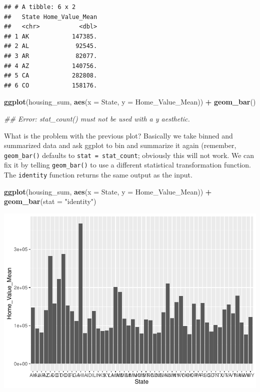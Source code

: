 \documentclass[]{book}
\newenvironment{Shaded}{\begin{snugshade}}{\end{snugshade}}
\newcommand{\CommentTok}[1]{\textcolor[rgb]{0.56,0.35,0.01}{\textit{#1}}}
\newcommand{\DataTypeTok}[1]{\textcolor[rgb]{0.13,0.29,0.53}{#1}}
\newcommand{\KeywordTok}[1]{\textcolor[rgb]{0.13,0.29,0.53}{\textbf{#1}}}
\newcommand{\NormalTok}[1]{#1}
\newcommand{\OperatorTok}[1]{\textcolor[rgb]{0.81,0.36,0.00}{\textbf{#1}}}
\newcommand{\StringTok}[1]{\textcolor[rgb]{0.31,0.60,0.02}{#1}}
\begin{document}
\begin{verbatim}
## # A tibble: 6 x 2
##   State Home_Value_Mean
##   <chr>           <dbl>
## 1 AK            147385.
## 2 AL             92545.
## 3 AR             82077.
## 4 AZ            140756.
## 5 CA            282808.
## 6 CO            158176.
\end{verbatim}

\begin{Shaded}
\begin{Highlighting}[]
\KeywordTok{ggplot}\NormalTok{(housing_sum, }\KeywordTok{aes}\NormalTok{(}\DataTypeTok{x =}\NormalTok{ State, }\DataTypeTok{y =}\NormalTok{ Home_Value_Mean)) }\OperatorTok{+}\StringTok{ }
\StringTok{  }\KeywordTok{geom_bar}\NormalTok{()}

\CommentTok{## Error: stat_count() must not be used with a y aesthetic.  }
\end{Highlighting}
\end{Shaded}

What is the problem with the previous plot? Basically we take binned and summarized data and ask ggplot to bin and summarize it again (remember, \texttt{geom\_bar()} defaults to \texttt{stat\ =\ stat\_count}; obviously this will not work. We can fix it by telling \texttt{geom\_bar()} to use a different statistical transformation function. The \texttt{identity} function returns the same output as the input.

\begin{Shaded}
\begin{Highlighting}[]
\KeywordTok{ggplot}\NormalTok{(housing_sum, }\KeywordTok{aes}\NormalTok{(}\DataTypeTok{x =}\NormalTok{ State, }\DataTypeTok{y =}\NormalTok{ Home_Value_Mean)) }\OperatorTok{+}\StringTok{ }
\StringTok{  }\KeywordTok{geom_bar}\NormalTok{(}\DataTypeTok{stat =} \StringTok{"identity"}\NormalTok{)}
\end{Highlighting}
\end{Shaded}

\includegraphics{R/Rgraphics/figures/unnamed-chunk-169-1.pdf}
\end{document}
